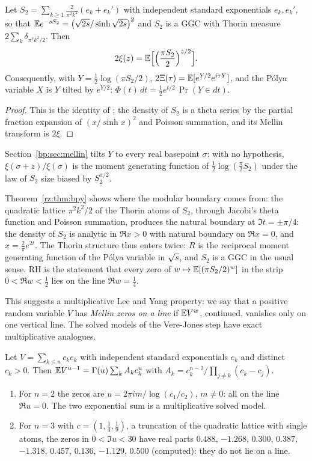 \begin{theorem}\label{rz:thm:bpy}
Let $S_2=\sum_{k\ge1}\frac{2}{\pi^2k^2}(e_k+e_k')$ with independent standard exponentials $e_k,e_k'$, so that $\mathbb{E} e^{-sS_2}=\bigl(\sqrt{2s}/\sinh\sqrt{2s}\bigr)^2$ and $S_2$ is a GGC with Thorin measure $2\sum_k\delta_{\pi^2k^2/2}$. Then
\[
2\xi(z)=\mathbb{E}\Bigl[\Bigl(\frac{\pi S_2}2\Bigr)^{z/2}\Bigr].
\]
Consequently, with $Y=\frac12\log(\pi S_2/2)$, $2\Xi(\tau)=\mathbb{E}[e^{Y/2}e^{i\tau Y}]$, and the P\'olya variable $X$ is $Y$ tilted by $e^{Y/2}$: $\Phi(t)\,dt=\frac12e^{t/2}\,\Pr(Y\in dt)$.
\end{theorem}

\begin{proof}
This is the identity of \cite[Section~2]{BPY01}; the density of $S_2$ is a theta series by the partial fraction expansion of $(x/\sinh x)^2$ and Poisson summation, and its Mellin transform is $2\xi$.
\end{proof}

Section~\ref{bp:sec:mellin} tilts $Y$ to every real basepoint $\sigma$: with no hypothesis, $\xi(\sigma+z)/\xi(\sigma)$ is the moment generating function of $\frac12\log(\frac\pi2S_2)$ under the law of $S_2$ size biased by $S_2^{\sigma/2}$.

Theorem~\ref{rz:thm:bpy} shows where the modular boundary comes from: the quadratic lattice $\pi^2k^2/2$ of the Thorin atoms of $S_2$, through Jacobi's theta function and Poisson summation, produces the natural boundary at $\Im t=\pm\pi/4$: the density of $S_2$ is analytic in $\Re x>0$ with natural boundary on $\Re x=0$, and $x=\frac2\pi e^{2t}$. The Thorin structure thus enters twice: $R$ is the reciprocal moment generating function of the P\'olya variable in $\sqrt{s}$, and $S_2$ is a GGC in the usual sense. RH is the statement that every zero of $w\mapsto\mathbb{E}[(\pi S_2/2)^w]$ in the strip $0<\Re w<\frac12$ lies on the line $\Re w=\frac14$.

This suggests a multiplicative Lee and Yang property: we say that a positive random variable $V$ has \emph{Mellin zeros on a line} if $\mathbb{E} V^{w}$, continued, vanishes only on one vertical line. The solved models of the Vere-Jones step have exact multiplicative analogues.

\begin{proposition}\label{rz:prop:multlee}
Let $V=\sum_{k\le n}c_ke_k$ with independent standard exponentials $e_k$ and distinct $c_k>0$. Then $\mathbb{E} V^{u-1}=\Gamma(u)\sum_kA_kc_k^{u}$ with $A_k=c_k^{n-2}/\prod_{j\ne k}(c_k-c_j)$.
\begin{enumerate}
\item[(i)] For $n=2$ the zeros are $u=2\pi i m/\log(c_1/c_2)$, $m\ne0$: all on the line $\Re u=0$. The two exponential sum is a multiplicative solved model.
\item[(ii)] For $n=3$ with $c=(1,\frac14,\frac19)$, a truncation of the quadratic lattice with single atoms, the zeros in $0<\Im u<30$ have real parts $0.488$, $-1.268$, $0.300$, $0.387$, $-1.318$, $0.457$, $0.136$, $-1.129$, $0.500$ (computed): they do not lie on a line.
\end{enumerate}
\end{proposition}

